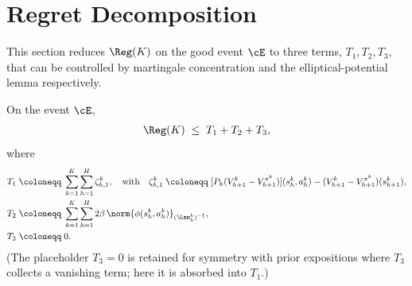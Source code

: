 \section{Regret Decomposition}\label{sec:decomposition}

This section reduces $\Reg(K)$ on the good event $\cE$ to three terms, $T_1, T_2, T_3$, that can be controlled by martingale concentration and the elliptical-potential lemma respectively.

\begin{lemma}\label{lem:decomposition}
On the event $\cE$,
\begin{align}\label{eq:reg_decomposition}
\Reg(K) \;\le\; T_1 + T_2 + T_3,
\end{align}
where
\begin{align}
T_1 &\;\coloneqq\; \sum_{k=1}^K \sum_{h=1}^H \zeta_{h, 1}^k, \quad \text{with}\quad \zeta_{h, 1}^k \;\coloneqq\; [P_h (V_{h+1}^k - V_{h+1}^{\pi^k})](s_h^k, a_h^k) - (V_{h+1}^k - V_{h+1}^{\pi^k})(s_{h+1}^k), \label{eq:T1_def}\\
T_2 &\;\coloneqq\; \sum_{k=1}^K \sum_{h=1}^H 2 \beta\, \norm{\phi(s_h^k, a_h^k)}_{(\Lam_h^k)^{-1}}, \label{eq:T2_def}\\
T_3 &\;\coloneqq\; 0. \label{eq:T3_def}
\end{align}
(The placeholder $T_3 = 0$ is retained for symmetry with prior expositions where $T_3$ collects a vanishing term; here it is absorbed into $T_1$.)
\end{lemma}

